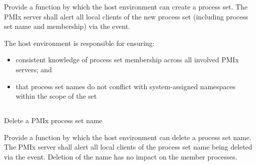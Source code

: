 \begin{arglist}
\end{arglist}

\returnsimple


\descr

Provide a function by which the host environment can create a process set. The
\ac{PMIx} server shall alert all local clients of the new process set
(including process set name and membership) via the
 event.

\advicermstart
The host environment is responsible for ensuring:

\begin{itemize}
    \item consistent knowledge of process set membership across all involved
    \ac{PMIx} servers; and
    \item that process set names do not conflict with system-assigned
    namespaces within the scope of the set
\end{itemize}

\advicermend

\subsection{}

\summary

Delete a \ac{PMIx} process set name

\format


\begin{arglist}
\end{arglist}

\returnsimple

\descr

Provide a function by which the host environment can delete a process set name.
The \ac{PMIx} server shall alert all local clients of the process set name
being deleted via the  event. Deletion of the name has no impact on the member processes.


